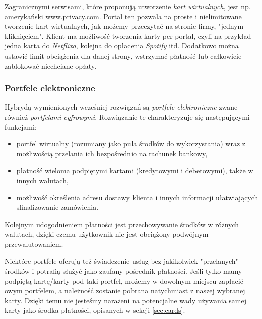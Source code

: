 \documentclass[12pt]{article}
\numberwithin{figure}{section}
\begin{document}
\begin{sloppypar}
Zagranicznymi serwisami, które  proponują utworzenie \textit{kart wirtualnych}, jest np. amerykański \url{www.privacy.com}. Portal ten pozwala na proste i nielimitowane tworzenie kart wirtualnych, jak możemy przeczytać na stronie firmy, "jednym kliknięciem". Klient ma możliwość tworzenia karty per portal, czyli na przykład jedna karta do \textit{Netflixa}, kolejna do opłacenia \textit{Spotify} itd. Dodatkowo można ustawić limit obciążenia dla danej strony, wstrzymać płatność lub całkowicie zablokować niechciane opłaty.

\subsubsection{Portfele elektroniczne}

Hybrydą wymienionych wcześniej rozwiązań są \textit{portfele elektroniczne} zwane również \textit{portfelami cyfrowymi}. Rozwiązanie te charakteryzuje się następującymi funkcjami: 
\begin{itemize}
    \item portfel wirtualny (rozumiany jako pula środków do wykorzystania) wraz z możliwością przelania ich bezpośrednio na rachunek bankowy,
    \item płatność wieloma podpiętymi kartami (kredytowymi i debetowymi), także w innych walutach,
    \item możliwość określenia adresu dostawy klienta i innych informacji ułatwiających sfinalizowanie zamówienia.
\end{itemize}

Kolejnym udogodnieniem płatności jest przechowywanie środków w różnych walutach, dzięki czemu użytkownik nie jest obciążony podwójnym przewalutowaniem.

Niektóre portfele oferują też świadczenie usług bez jakikolwiek "przelanych" środków i potrafią służyć jako zaufany pośrednik płatności. Jeśli tylko mamy podpiętą kartę/karty pod taki portfel, możemy w dowolnym miejscu zapłacić owym portfelem, a należność zostanie pobrana natychmiast z naszej wybranej karty. Dzięki temu nie jesteśmy narażeni na potencjalne wady używania samej karty jako środka płatności, opisanych w sekcji \ref{sec:cards}.


\end{sloppypar}
\end{document}
